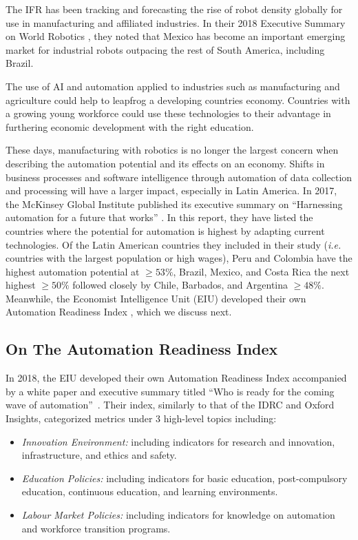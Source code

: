 \documentclass[conference]{IEEEtran}
\begin{document}
The IFR has been tracking and forecasting the rise of robot density globally for use in manufacturing and affiliated industries. In their 2018 Executive Summary on World Robotics \cite{robotics2016executive}, they noted that Mexico has become an important emerging market for industrial robots outpacing the rest of South America, including Brazil.

The use of AI and automation applied to industries such as manufacturing and agriculture could help to leapfrog a developing countries economy. Countries with a growing young workforce could use these technologies to their advantage in furthering economic development with the right education.

These days, manufacturing with robotics is no longer the largest concern when describing the automation potential and its effects on an economy. Shifts in business processes and software intelligence through automation of data collection and processing will have a larger impact, especially in Latin America. In 2017, the McKinsey Global Institute published its executive summary on ``Harnessing automation for a future that works'' \cite{manyika2017future}. In this report, they have listed the countries where the potential for automation is highest by adapting current technologies. Of the Latin American countries they included in their study (\emph{i.e.} countries with the largest population or high wages), Peru and Colombia have the highest automation potential at $\geq 53\%$, Brazil, Mexico, and Costa Rica the next highest $\geq 50\%$ followed closely by Chile, Barbados, and Argentina $\geq 48\%$. Meanwhile, the Economist Intelligence Unit (EIU) developed their own Automation Readiness Index \cite{unit2018automation}, which we discuss next.


\subsection{On The Automation Readiness Index}

In 2018, the EIU developed their own Automation Readiness Index accompanied by a white paper and executive summary titled ``Who is ready for the coming wave of automation''~\cite{unit2018automation}. Their index, similarly to that of the IDRC and Oxford Insights, categorized metrics under 3 high-level topics including:
\begin{itemize}
  \item \emph{Innovation Environment:} including indicators for research and innovation, infrastructure, and ethics and safety.
  \item \emph{Education Policies:} including indicators for basic education, post-compulsory education, continuous education, and learning environments.
  \item \emph{Labour Market Policies:} including indicators for knowledge on automation and workforce transition programs.
\end{itemize}
\end{document}
